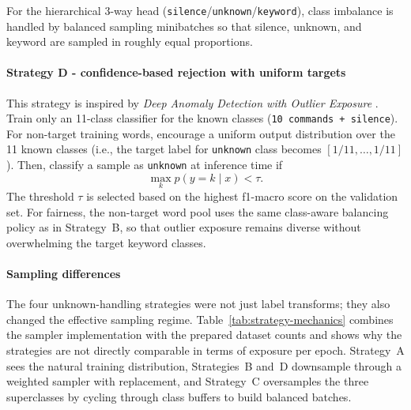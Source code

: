 \documentclass[11pt]{article}
\begin{document}
For the hierarchical 3-way head (\texttt{silence}/\texttt{unknown}/\texttt{keyword}), class imbalance is handled by balanced sampling minibatches so that silence, unknown, and keyword are sampled in roughly equal proportions.

\paragraph*{Strategy D - confidence-based rejection with uniform targets}

This strategy is inspired by \textit{Deep Anomaly Detection with Outlier Exposure} \cite{oe}.
\\

Train only an 11-class classifier for the known classes (\texttt{10 commands + silence}). For non-target training words, encourage a uniform output distribution over the 11 known classes (i.e., the target label for \texttt{unknown} class becomes \([1/11, \dots, 1/11]\)). Then, classify a sample as \texttt{unknown} at inference time if
\[
\max_k p(y = k \mid x) < \tau.
\]
The threshold \(\tau\) is selected based on the highest f1-macro score on the validation set. For fairness, the non-target word pool uses the same class-aware balancing policy as in Strategy~B, so that outlier exposure remains diverse without overwhelming the target keyword classes.


\paragraph*{Sampling differences}
The four unknown-handling strategies were not just label transforms; they also changed the effective sampling regime. Table~\ref{tab:strategy-mechanics} combines the sampler implementation with the prepared dataset counts and shows why the strategies are not directly comparable in terms of exposure per epoch. Strategy~A sees the natural training distribution, Strategies~B and~D downsample through a weighted sampler with replacement, and Strategy~C oversamples the three superclasses by cycling through class buffers to build balanced batches.
\end{document}

